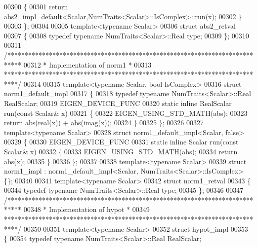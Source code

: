 \begin{DoxyCode}
00300   \{
00301     \textcolor{keywordflow}{return} abs2\_impl\_default<Scalar,NumTraits<Scalar>::IsComplex>::run(x);
00302   \}
00303 \};
00304 
00305 \textcolor{keyword}{template}<\textcolor{keyword}{typename} Scalar>
00306 \textcolor{keyword}{struct }abs2\_retval
00307 \{
00308   \textcolor{keyword}{typedef} \textcolor{keyword}{typename} NumTraits<Scalar>::Real type;
00309 \};
00310 
00311 \textcolor{comment}{/****************************************************************************}
00312 \textcolor{comment}{* Implementation of norm1                                                *}
00313 \textcolor{comment}{****************************************************************************/}
00314 
00315 \textcolor{keyword}{template}<\textcolor{keyword}{typename} Scalar, \textcolor{keywordtype}{bool} IsComplex>
00316 \textcolor{keyword}{struct }norm1\_default\_impl
00317 \{
00318   \textcolor{keyword}{typedef} \textcolor{keyword}{typename} NumTraits<Scalar>::Real RealScalar;
00319   EIGEN\_DEVICE\_FUNC
00320   \textcolor{keyword}{static} \textcolor{keyword}{inline} RealScalar run(\textcolor{keyword}{const} Scalar& x)
00321   \{
00322     EIGEN\_USING\_STD\_MATH(abs);
00323     \textcolor{keywordflow}{return} abs(real(x)) + abs(imag(x));
00324   \}
00325 \};
00326 
00327 \textcolor{keyword}{template}<\textcolor{keyword}{typename} Scalar>
00328 \textcolor{keyword}{struct }norm1\_default\_impl<Scalar, false>
00329 \{
00330   EIGEN\_DEVICE\_FUNC
00331   \textcolor{keyword}{static} \textcolor{keyword}{inline} Scalar run(\textcolor{keyword}{const} Scalar& x)
00332   \{
00333     EIGEN\_USING\_STD\_MATH(abs);
00334     \textcolor{keywordflow}{return} abs(x);
00335   \}
00336 \};
00337 
00338 \textcolor{keyword}{template}<\textcolor{keyword}{typename} Scalar>
00339 \textcolor{keyword}{struct }norm1\_impl : norm1\_default\_impl<Scalar, NumTraits<Scalar>::IsComplex> \{\};
00340 
00341 \textcolor{keyword}{template}<\textcolor{keyword}{typename} Scalar>
00342 \textcolor{keyword}{struct }norm1\_retval
00343 \{
00344   \textcolor{keyword}{typedef} \textcolor{keyword}{typename} NumTraits<Scalar>::Real type;
00345 \};
00346 
00347 \textcolor{comment}{/****************************************************************************}
00348 \textcolor{comment}{* Implementation of hypot                                                *}
00349 \textcolor{comment}{****************************************************************************/}
00350 
00351 \textcolor{keyword}{template}<\textcolor{keyword}{typename} Scalar>
00352 \textcolor{keyword}{struct }hypot\_impl
00353 \{
00354   \textcolor{keyword}{typedef} \textcolor{keyword}{typename} NumTraits<Scalar>::Real RealScalar;

\end{DoxyCode}
